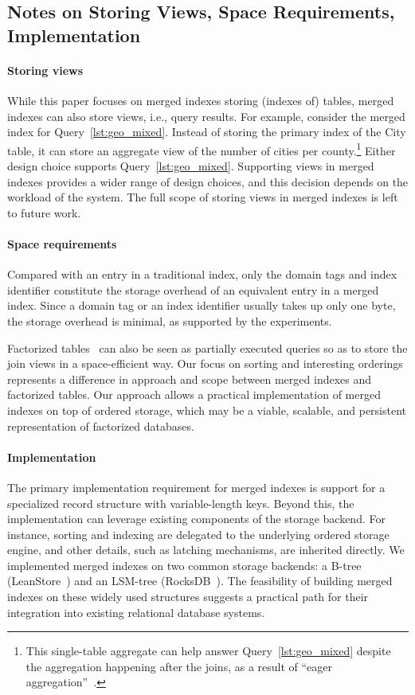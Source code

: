 \documentclass[sigconf, pdfa, nonacm]{acmart}
\begin{document}
\subsection{Notes on Storing Views, Space Requirements, Implementation}\label{sec:space_implementation}

\paragraph{Storing views}

While this paper focuses on merged indexes storing (indexes of) tables, merged indexes can also store views, i.e., query results.
For example, consider the merged index for Query~\ref{lst:geo_mixed}.
Instead of storing the primary index of the City table, it can store an aggregate view of the number of cities per county.\footnote{This single-table aggregate can help answer Query~\ref{lst:geo_mixed} despite the aggregation happening after the joins, as a result of ``eager aggregation''~\cite{yan95aggregate,chaudhuri94aggregate}.}
Either design choice supports Query~\ref{lst:geo_mixed}.
Supporting views in merged indexes provides a wider range of design choices, and this decision depends on the workload of the system.
The full scope of storing views in merged indexes is left to future work.

\paragraph{Space requirements}

Compared with an entry in a traditional index, only the domain tags and index identifier constitute the storage overhead of an equivalent entry in a merged index. Since a domain tag or an index identifier usually takes up only one byte, the storage overhead is minimal, as supported by the experiments.

Factorized tables~\cite{factorizedDB} can also be seen as partially executed queries so as to store the join views in a space-efficient way. Our focus on sorting and interesting orderings represents a difference in approach and scope between merged indexes and factorized tables. Our approach allows a practical implementation of merged indexes on top of ordered storage, which may be a viable, scalable, and persistent representation of factorized databases.

\paragraph{Implementation}
The primary implementation requirement for merged indexes is support for a specialized record structure with variable-length keys. Beyond this, the implementation can leverage existing components of the storage backend. For instance, sorting and indexing are delegated to the underlying ordered storage engine, and other details, such as latching mechanisms, are inherited directly.
We implemented merged indexes on two common storage backends: a B-tree (LeanStore~\cite{leanstore18}) and an LSM-tree (RocksDB~\cite{rocksdb21}). The feasibility of building merged indexes on these widely used structures suggests a practical path for their integration into existing relational database systems.
\end{document}
